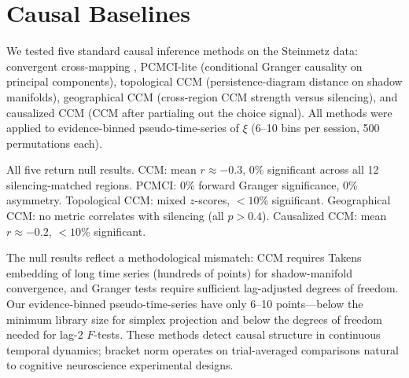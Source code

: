 \documentclass[9pt,lineno]{elife}
\begin{document}
\section{Causal Baselines}
\label{app:causal_baselines}

We tested five standard causal inference methods on the Steinmetz data: convergent cross-mapping \citep[CCM;][]{sugihara2012detecting}, PCMCI-lite (conditional Granger causality on principal components), topological CCM (persistence-diagram distance on shadow manifolds), geographical CCM (cross-region CCM strength versus silencing), and causalized CCM (CCM after partialing out the choice signal). All methods were applied to evidence-binned pseudo-time-series of $\xi$ (6--10 bins per session, 500 permutations each).

All five return null results. CCM: mean $r \approx -0.3$, 0\% significant across all 12 silencing-matched regions. PCMCI: 0\% forward Granger significance, 0\% asymmetry. Topological CCM: mixed $z$-scores, $< 10$\% significant. Geographical CCM: no metric correlates with silencing (all $p > 0.4$). Causalized CCM: mean $r \approx -0.2$, $< 10$\% significant.

The null results reflect a methodological mismatch: CCM requires Takens embedding of long time series (hundreds of points) for shadow-manifold convergence, and Granger tests require sufficient lag-adjusted degrees of freedom. Our evidence-binned pseudo-time-series have only 6--10 points---below the minimum library size for simplex projection and below the degrees of freedom needed for lag-2 $F$-tests. These methods detect causal structure in continuous temporal dynamics; bracket norm operates on trial-averaged comparisons natural to cognitive neuroscience experimental designs.
\end{document}
